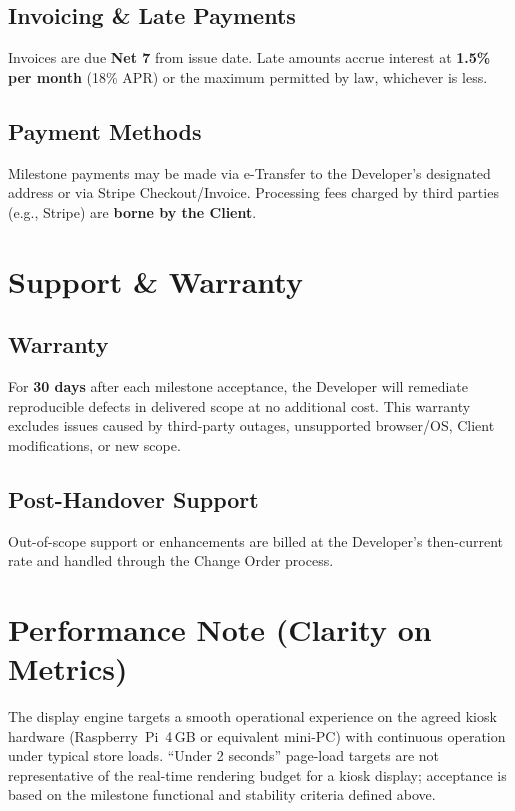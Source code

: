 \documentclass[11pt, a4paper]{article}
\begin{document}
\subsection*{Invoicing \& Late Payments}
Invoices are due \textbf{Net 7} from issue date. Late amounts accrue interest at \textbf{1.5\% per month} (18\% APR) or the maximum permitted by law, whichever is less.

\subsection*{Payment Methods}
Milestone payments may be made via e-Transfer to the Developer's designated address or via Stripe Checkout/Invoice. Processing fees charged by third parties (e.g., Stripe) are \textbf{borne by the Client}.

\section{Support \& Warranty}
\subsection*{Warranty}
For \textbf{30 days} after each milestone acceptance, the Developer will remediate reproducible defects in delivered scope at no additional cost. This warranty excludes issues caused by third-party outages, unsupported browser/OS, Client modifications, or new scope.

\subsection*{Post-Handover Support}
Out-of-scope support or enhancements are billed at the Developer's then-current rate and handled through the Change Order process.

\section{Performance Note (Clarity on Metrics)}
The display engine targets a smooth operational experience on the agreed kiosk hardware (Raspberry~Pi~4\,GB or equivalent mini-PC) with continuous operation under typical store loads. ``Under 2 seconds'' page-load targets are not representative of the real-time rendering budget for a kiosk display; acceptance is based on the milestone functional and stability criteria defined above.

\end{document}
